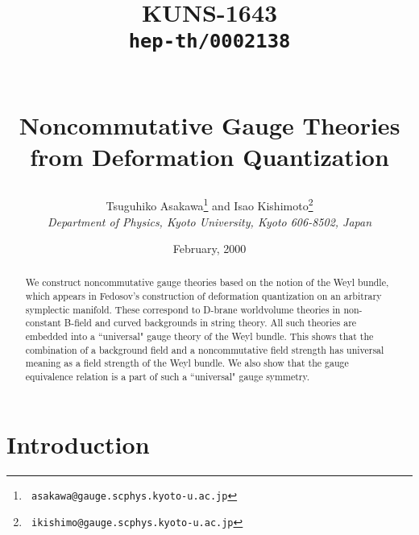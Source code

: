 \documentclass[10pt,a4paper]{article}
\begin{document}
\begin{titlepage}
\title{
\hfill\parbox{4cm}
{\normalsize KUNS-1643\\{\tt hep-th/0002138}}\\
\vspace{1cm}
Noncommutative Gauge Theories\\ from Deformation Quantization}
\author{
Tsuguhiko {\sc Asakawa}\thanks{{\tt
    asakawa@gauge.scphys.kyoto-u.ac.jp}}
and
Isao {\sc Kishimoto}\thanks{{\tt
    ikishimo@gauge.scphys.kyoto-u.ac.jp}}
\\[7pt]
{\it Department of Physics, Kyoto University, Kyoto 606-8502, Japan}
}
\date{\normalsize February, 2000}
\maketitle
\thispagestyle{empty}

\begin{abstract}
\normalsize
We construct noncommutative gauge theories based on the notion of the Weyl bundle, which appears in Fedosov's construction of deformation quantization on an arbitrary symplectic manifold. These correspond to D-brane worldvolume theories in non-constant B-field and curved backgrounds in string theory. All such theories are embedded into a ``universal" gauge theory of the Weyl bundle. This shows that the combination of a background field and a noncommutative field strength has universal meaning as a field strength of the Weyl bundle. We also show that the gauge equivalence relation is a part of such a ``universal" gauge symmetry.
\end{abstract}

 
\end{titlepage}




\section{Introduction
\label{sec:intro} }
\end{document}
